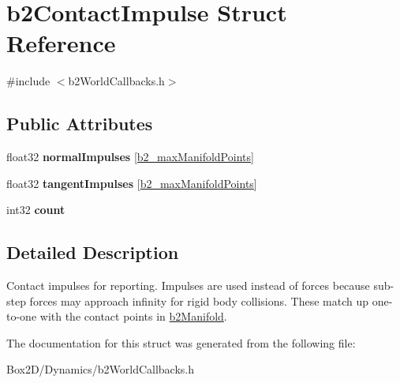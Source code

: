 \hypertarget{structb2_contact_impulse}{}\section{b2\+Contact\+Impulse Struct Reference}
\label{structb2_contact_impulse}


{\ttfamily \#include $<$b2\+World\+Callbacks.\+h$>$}

\subsection*{Public Attributes}
\begin{DoxyCompactItemize}
\item 
\mbox{\label{structb2_contact_impulse_a553d3562a3a34ea013e2d9860f6fd207}} 
float32 {\bfseries normal\+Impulses} \mbox{[}\hyperlink{b2_settings_8h_aa5f44cc9edf711433dea2b2ec94f3c42}{b2\+\_\+max\+Manifold\+Points}\mbox{]}
\item 
\mbox{\label{structb2_contact_impulse_aebd9875b1f55a90865770a53e30e609a}} 
float32 {\bfseries tangent\+Impulses} \mbox{[}\hyperlink{b2_settings_8h_aa5f44cc9edf711433dea2b2ec94f3c42}{b2\+\_\+max\+Manifold\+Points}\mbox{]}
\item 
\mbox{\label{structb2_contact_impulse_a258e094ab0d769971f40d6c144420bf7}} 
int32 {\bfseries count}
\end{DoxyCompactItemize}


\subsection{Detailed Description}
Contact impulses for reporting. Impulses are used instead of forces because sub-\/step forces may approach infinity for rigid body collisions. These match up one-\/to-\/one with the contact points in \hyperlink{structb2_manifold}{b2\+Manifold}. 

The documentation for this struct was generated from the following file\+:\begin{DoxyCompactItemize}
\item 
Box2\+D/\+Dynamics/b2\+World\+Callbacks.\+h\end{DoxyCompactItemize}
